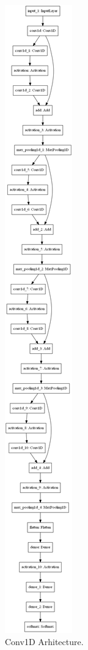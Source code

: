 \documentclass{article}
\begin{document}
\begin{appendices}

\begin{figure}[!ht]
  \centering
  \includegraphics[width=\textwidth,height=\textheight,keepaspectratio]{model}
  \caption{Conv1D Arhitecture.}
  \label{Conv1D_Arhitecture}
\end{figure}

\end{appendices}
\end{document}
